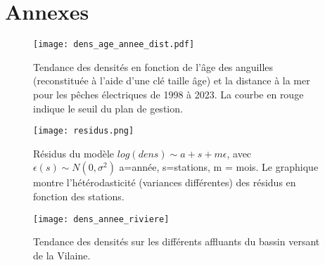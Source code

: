 \documentclass[10pt,twocolumn,titlepage,twoside]{article}\usepackage[]{graphicx}\usepackage[]{color}
\begin{document}
\section{Annexes}
\small

\normalsize
\begin{figure}[htbp]
\centering
\texttt{[image: dens\_age\_annee\_dist.pdf]}
\caption[Densité par âge et distance.]{Tendance des
densités en fonction de l'âge des anguilles (reconstituée à l'aide d'une clé
taille âge) et la distance à la mer pour les pêches électriques de 1998 à 2023.
La courbe en rouge indique le seuil du plan de gestion.}
\label{dens_age_annee_dist}
\end{figure}


\begin{figure}[htbp]
\centering
\texttt{[image: residus.png]}
\caption[Tendance des densités modèle]{Résidus du modèle $log(dens) \sim a +s +m
\epsilon$, avec $\epsilon(s) \sim N(0,\sigma^2)$ a=année, s=stations, m = mois.
Le graphique montre l'hétérodasticité (variances différentes) des résidus en
fonction des stations.}
\label{residus}
\end{figure}

\begin{figure}[htbp]
\centering
 \texttt{[image: dens\_annee\_riviere]}
\caption[Tendance des densités par rivières]{Tendance des densités sur les
différents affluants du bassin versant de la Vilaine.}
\label{dens_annee_riviere}
\end{figure}
\end{document}
